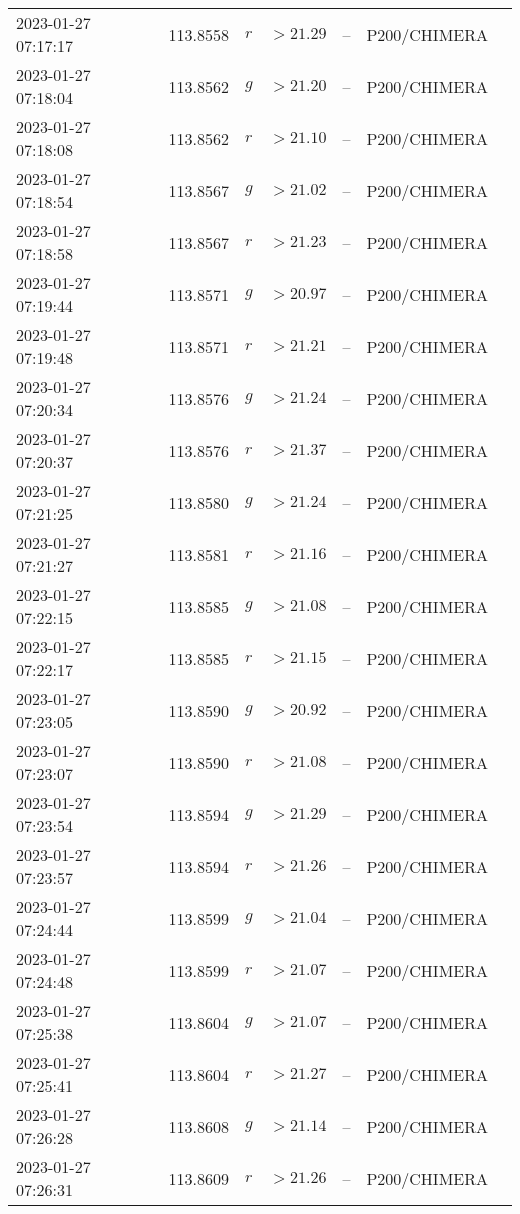 \documentclass{nature_plusfigure}
\begin{document}
\begin{supplement}
\begin{center}
\begin{longtable}{lllllll}
2023-01-27 07:17:17 & 113.8558 & $r$ & $>21.29$ & -- & P200/CHIMERA &  \\ 
2023-01-27 07:18:04 & 113.8562 & $g$ & $>21.20$ & -- & P200/CHIMERA &  \\ 
2023-01-27 07:18:08 & 113.8562 & $r$ & $>21.10$ & -- & P200/CHIMERA &  \\ 
2023-01-27 07:18:54 & 113.8567 & $g$ & $>21.02$ & -- & P200/CHIMERA &  \\ 
2023-01-27 07:18:58 & 113.8567 & $r$ & $>21.23$ & -- & P200/CHIMERA &  \\ 
2023-01-27 07:19:44 & 113.8571 & $g$ & $>20.97$ & -- & P200/CHIMERA &  \\ 
2023-01-27 07:19:48 & 113.8571 & $r$ & $>21.21$ & -- & P200/CHIMERA &  \\ 
2023-01-27 07:20:34 & 113.8576 & $g$ & $>21.24$ & -- & P200/CHIMERA &  \\ 
2023-01-27 07:20:37 & 113.8576 & $r$ & $>21.37$ & -- & P200/CHIMERA &  \\ 
2023-01-27 07:21:25 & 113.8580 & $g$ & $>21.24$ & -- & P200/CHIMERA &  \\ 
2023-01-27 07:21:27 & 113.8581 & $r$ & $>21.16$ & -- & P200/CHIMERA &  \\ 
2023-01-27 07:22:15 & 113.8585 & $g$ & $>21.08$ & -- & P200/CHIMERA &  \\ 
2023-01-27 07:22:17 & 113.8585 & $r$ & $>21.15$ & -- & P200/CHIMERA &  \\ 
2023-01-27 07:23:05 & 113.8590 & $g$ & $>20.92$ & -- & P200/CHIMERA &  \\ 
2023-01-27 07:23:07 & 113.8590 & $r$ & $>21.08$ & -- & P200/CHIMERA &  \\ 
2023-01-27 07:23:54 & 113.8594 & $g$ & $>21.29$ & -- & P200/CHIMERA &  \\ 
2023-01-27 07:23:57 & 113.8594 & $r$ & $>21.26$ & -- & P200/CHIMERA &  \\ 
2023-01-27 07:24:44 & 113.8599 & $g$ & $>21.04$ & -- & P200/CHIMERA &  \\ 
2023-01-27 07:24:48 & 113.8599 & $r$ & $>21.07$ & -- & P200/CHIMERA &  \\ 
2023-01-27 07:25:38 & 113.8604 & $g$ & $>21.07$ & -- & P200/CHIMERA &  \\ 
2023-01-27 07:25:41 & 113.8604 & $r$ & $>21.27$ & -- & P200/CHIMERA &  \\ 
2023-01-27 07:26:28 & 113.8608 & $g$ & $>21.14$ & -- & P200/CHIMERA &  \\ 
2023-01-27 07:26:31 & 113.8609 & $r$ & $>21.26$ & -- & P200/CHIMERA &  \\ 

\end{longtable}
\end{center}
\end{supplement}
\end{document}
